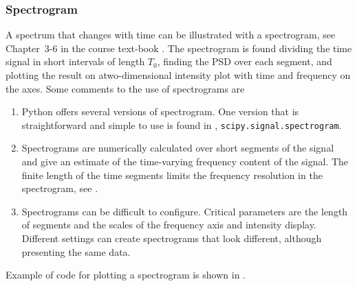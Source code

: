 \subsubsection{Spectrogram}
A spectrum that changes with time can be illustrated with a spectrogram, see Chapter~3-6 in the course text-book \cite{mcclellan_dsp_2016}.
The spectrogram is found dividing the time signal in short intervals of length $T_0$, finding the PSD over each segment, and plotting the result on atwo-dimensional intensity plot with time and frequency on the axes.
Some comments to the use of spectrograms are
\begin{enumerate}
	\item Python offers several versions of spectrogram. 
	One version that is straightforward and simple to use is found in \scipy, \verb|scipy.signal.spectrogram|. 

	\item Spectrograms are numerically calculated over short segments of the signal and give an estimate of the time-varying frequency content of the signal. The finite length of the time segments limits the frequency resolution in the spectrogram, see .
	
	\item Spectrograms can be difficult to configure.
	Critical parameters are the length of segments and the scales of the frequency axis and intensity display.	
	Different settings can create spectrograms that look different, although presenting the same data.

\end{enumerate}
Example of code for plotting a spectrogram is shown in .



